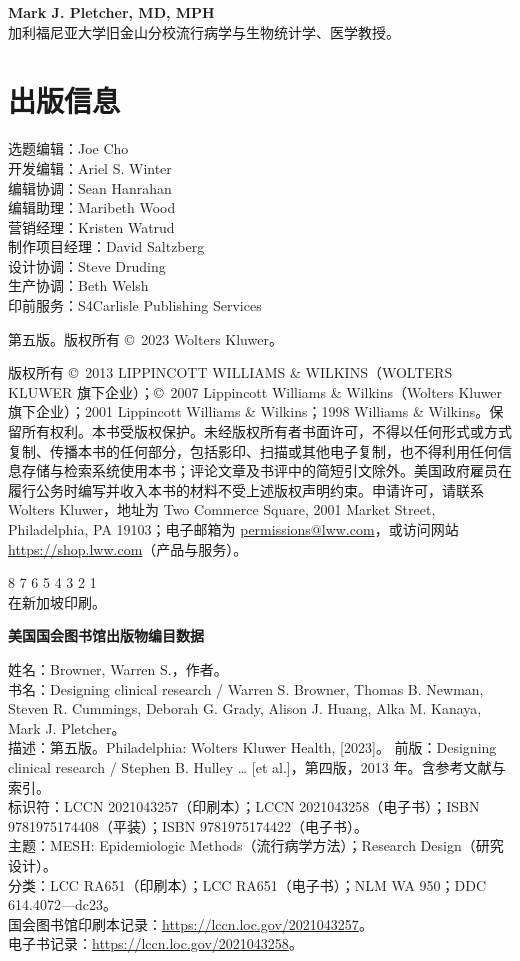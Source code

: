 \noindent\textbf{Mark J. Pletcher, MD, MPH}\\
加利福尼亚大学旧金山分校流行病学与生物统计学、医学教授。
\endgroup

\chapter*{出版信息}
\begingroup\fontsize{9.5}{14}\selectfont
\noindent 选题编辑：Joe Cho\\
开发编辑：Ariel S. Winter\\
编辑协调：Sean Hanrahan\\
编辑助理：Maribeth Wood\\
营销经理：Kristen Watrud\\
制作项目经理：David Saltzberg\\
设计协调：Steve Druding\\
生产协调：Beth Welsh\\
印前服务：S4Carlisle Publishing Services

第五版。版权所有 \copyright\ 2023 Wolters Kluwer。

版权所有 \copyright\ 2013 LIPPINCOTT WILLIAMS \& WILKINS（WOLTERS KLUWER 旗下企业）；\copyright\ 2007 Lippincott Williams \& Wilkins（Wolters Kluwer 旗下企业）；2001 Lippincott Williams \& Wilkins；1998 Williams \& Wilkins。保留所有权利。本书受版权保护。未经版权所有者书面许可，不得以任何形式或方式复制、传播本书的任何部分，包括影印、扫描或其他电子复制，也不得利用任何信息存储与检索系统使用本书；评论文章及书评中的简短引文除外。美国政府雇员在履行公务时编写并收入本书的材料不受上述版权声明约束。申请许可，请联系 Wolters Kluwer，地址为 Two Commerce Square, 2001 Market Street, Philadelphia, PA 19103；电子邮箱为 \href{mailto:permissions@lww.com}{permissions@lww.com}，或访问网站 \url{https://shop.lww.com}（产品与服务）。

 8 7 6 5 4 3 2 1\\在新加坡印刷。

\noindent\textbf{美国国会图书馆出版物编目数据}

姓名：Browner, Warren S.，作者。\\
书名：Designing clinical research / Warren S. Browner, Thomas B. Newman, Steven R. Cummings, Deborah G. Grady, Alison J. Huang, Alka M. Kanaya, Mark J. Pletcher。\\
描述：第五版。Philadelphia: Wolters Kluwer Health, [2023]。
前版：Designing clinical research / Stephen B. Hulley … [et al.]，第四版，2013 年。含参考文献与索引。\\
标识符：LCCN 2021043257（印刷本）；LCCN 2021043258（电子书）；ISBN 9781975174408（平装）；ISBN 9781975174422（电子书）。\\
主题：MESH: Epidemiologic Methods（流行病学方法）；Research Design（研究设计）。\\
分类：LCC RA651（印刷本）；LCC RA651（电子书）；NLM WA 950；DDC 614.4072—dc23。\\
国会图书馆印刷本记录：\url{https://lccn.loc.gov/2021043257}。\\
电子书记录：\url{https://lccn.loc.gov/2021043258}。

